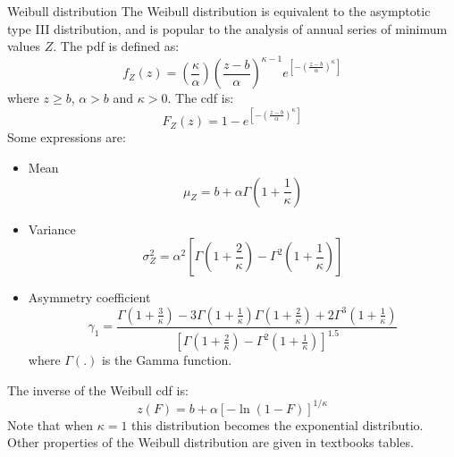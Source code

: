 \documentclass[8pt]{beamer}
\renewcommand{\emph}[1]{\textcolor{myorange}{#1}}
\begin{document}
\begin{frame}{Weibull distribution}
    The \alert{Weibull distribution} is equivalent to the asymptotic type III distribution, and is popular to the analysis of annual series of minimum values $Z$. The \emph{pdf} is defined as:
    \[
        f_Z (z) = \left( \frac{\kappa}{\alpha} \right) \left( \frac{z-b}{\alpha} \right)^{\kappa -1} e^{\left[ - \left( \frac{z-b}{\alpha} \right)^\kappa \right]}
    \]
    where $z \geq b$, $\alpha > b $ and $\kappa > 0$. The \emph{cdf} is:
    \[
        F_Z (z) = 1- e^{\left[ - \left( \frac{z-b}{\alpha} \right)^\kappa \right]}
    \]
    Some expressions are:
        \begin{itemize}
            \item \emph{Mean}
                \[
                    \mu_Z = b + \alpha \Gamma \left(1 + \frac{1}{\kappa} \right)
                \]

            \item \emph{Variance}
                \[
                    \sigma_Z^2 = \alpha^2 \left[ \Gamma \left( 1 + \frac{2}{\kappa} \right) - \Gamma^2 \left( 1 + \frac{1}{\kappa} \right) \right]
                \]
            \item \emph{Asymmetry coefficient}
                \[
                    \gamma_1 = \frac{\Gamma \left( 1 + \frac{3}{\kappa} \right) - 3\Gamma \left( 1 + \frac{1}{\kappa} \right)\Gamma \left( 1 + \frac{2}{\kappa} \right) + 2\Gamma^3 \left( 1 + \frac{1}{\kappa} \right) }{\left[\Gamma \left( 1 + \frac{2}{\kappa} \right) - \Gamma^2 \left( 1 + \frac{1}{\kappa} \right) \right]^{1.5}}
                \]
                where $\Gamma(.)$ is the \emph{Gamma function}.
        \end{itemize}
         The inverse of the \emph{ Weibull cdf} is:
         \[
             z(F) = b + \alpha \left[ -\ln \left(1-F \right) \right]^{1/\kappa}
         \]
         Note that when $\kappa = 1$ this distribution becomes the \emph{exponential distributio}. Other properties of the \emph{Weibull distribution} are given in textbooks tables. 

\end{frame}
\end{document}
